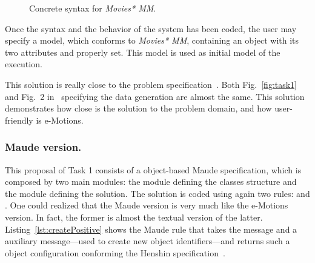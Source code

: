 \begin{figure}[htp]
  \hfill
  \hfill
  \hfill
  \hfill
  \caption{Concrete syntax for \textit{Movies* MM}.}
  \label{fig:concreteSyntax}
\end{figure}

Once the syntax and the behavior of the system has been coded, the user may specify a model, which conforms to \textit{Movies* MM}, containing an object  with its two attributes  and  properly set. This model is used as initial model of the execution.

This solution is really close to the problem specification~\cite{imdbcase}. Both Fig.~\ref{fig:task1} and Fig.~2 in~\cite{imdbcase} specifying the data generation are almost the same. This solution demonstrates how close is the solution to the problem domain, and how user-friendly is e-Motions.

\subsubsection{Maude version.}
This proposal of Task 1 consists of a object-based Maude specification, which is composed by two main modules: the  module defining the classes structure and the  module defining the solution. The solution is coded using again two rules:  and . One could realized that the Maude version is very much like the e-Motions version. In fact, the former is almost the textual version of the latter. Listing~\ref{lst:createPositive} shows the  Maude rule that takes the  message and a  auxiliary message---used to create new object identifiers---and returns such a object configuration conforming the Henshin specification~\cite{imdbcase}.

